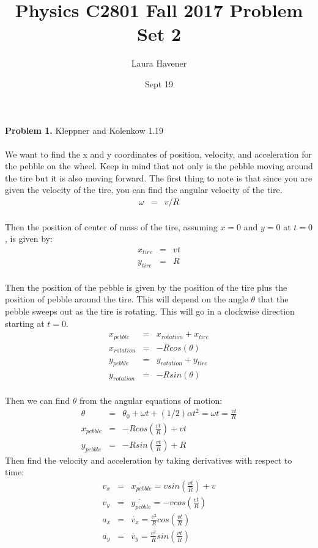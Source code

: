\documentclass[11pt]{amsart}
\title{Physics C2801 Fall 2017 Problem Set 2}
\author{Laura Havener}
\date{Sept 19} %
\begin{document}
\maketitle

\textbf{Problem 1.} Kleppner and Kolenkow 1.19 \\ \\
We want to find the x and y coordinates of position, velocity, and acceleration for the pebble on the wheel. Keep in mind that not only is the pebble moving around the tire but it is also moving forward. The first thing to note is that since you are given the velocity of the tire, you can find the angular velocity of the tire. \\
\begin{eqnarray*}
\omega &=& v/R
\end{eqnarray*} \\
Then the position of center of mass of the tire, assuming $x=0$ and $y=0$ at $t=0$, is given by: \\ 
\begin{eqnarray*}
x_{tire} &=& vt \\
y_{tire} &=& R 
\end{eqnarray*} \\
Then the position of the pebble is given by the position of the tire plus the position of pebble around the tire. This will depend on the angle $\theta$ that the pebble sweeps out as the tire is rotating. This will go in a clockwise direction starting at $t=0$. \\
\begin{eqnarray*}
x_{pebble} &=& x_{rotation}+x_{tire} \\
x_{rotation} &=& -Rcos(\theta) \\
y_{pebble} &=& y_{rotation}+y_{tire} \\
y_{rotation} &=& -Rsin(\theta)
\end{eqnarray*} \\
Then we can find $\theta$ from the angular equations of motion: \\
\begin{eqnarray*} 
\theta &=& \theta_{0} + \omega{t} + (1/2)\alpha{t^{2}}  = \omega{t} = \frac{vt}{R} \\
x_{pebble} &=& -Rcos(\frac{vt}{R})+vt \\
y_{pebble} &=& -Rsin(\frac{vt}{R})+R 
\end{eqnarray*}
Then find the velocity and acceleration by taking derivatives with respect to time: \\
\begin{eqnarray*}
v_{x} &=& \dot{x_{pebble}} = vsin(\frac{vt}{R}) +v \\
v_{y} &=& \dot{y_{pebble}} = -vcos(\frac{vt}{R}) \\ 
a_{x} &=&\dot{v_{x}} = \frac{v^{2}}{R}cos(\frac{vt}{R}) \\
a_{y} &=& \dot{v_{y}} = \frac{v^{2}}{R}sin(\frac{vt}{R}) 
\end{eqnarray*} \\
\end{document}
